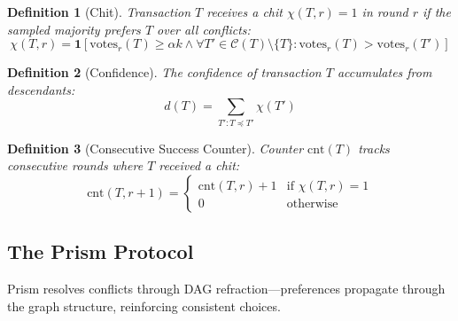 \documentclass[11pt,a4paper]{article}
\newtheorem{definition}{Definition}
\begin{document}
\begin{definition}[Chit]
Transaction $T$ receives a chit $\chi(T, r) = 1$ in round $r$ if the sampled majority prefers $T$ over all conflicts:
\begin{equation}
\chi(T, r) = \mathbf{1}\left[\text{votes}_r(T) \geq \alpha k \land \forall T' \in \mathcal{C}(T) \setminus \{T\} : \text{votes}_r(T) > \text{votes}_r(T')\right]
\end{equation}
\end{definition}

\begin{definition}[Confidence]
The confidence of transaction $T$ accumulates from descendants:
\begin{equation}
d(T) = \sum_{T' : T \preceq T'} \chi(T')
\end{equation}
\end{definition}

\begin{definition}[Consecutive Success Counter]
Counter $\text{cnt}(T)$ tracks consecutive rounds where $T$ received a chit:
\begin{equation}
\text{cnt}(T, r+1) = \begin{cases}
\text{cnt}(T, r) + 1 & \text{if } \chi(T, r) = 1 \\
0 & \text{otherwise}
\end{cases}
\end{equation}
\end{definition}

\subsection{The Prism Protocol}

Prism resolves conflicts through DAG refraction---preferences propagate through the graph structure, reinforcing consistent choices.
\end{document}
